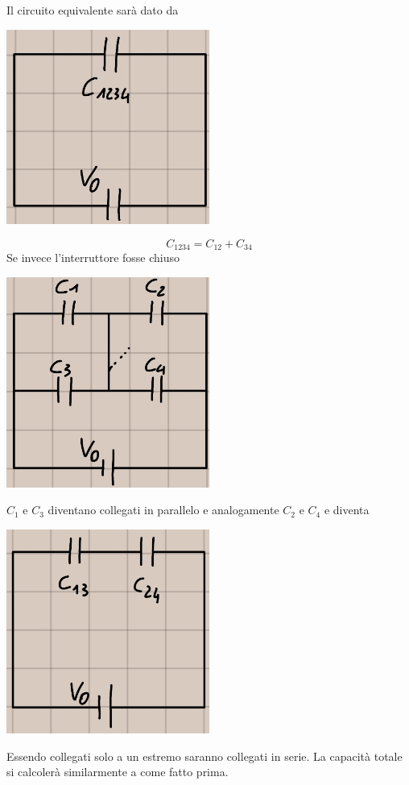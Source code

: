 \documentclass[a4paper, 12pt]{book}
\theoremstyle{plain}
\begin{document}
Il circuito equivalente sarà dato da 
\begin{center}
    \includegraphics[width=0.5\textwidth]{coll_parall_3.jpg}
\end{center}
\[C_{1234} = C_{12} + C_{34} \] 
Se invece l'interruttore fosse chiuso 
\begin{center}
    \includegraphics[width=0.5\textwidth]{int_chiuso.jpg}
\end{center}
$C_1$ e $C_3$ diventano collegati in parallelo e analogamente
$C_2$ e $C_4$ e diventa 
\begin{center}
    \includegraphics[width=0.5\textwidth]{int_chiuso2.jpg}
\end{center}
Essendo collegati solo a un estremo saranno collegati in serie.
La capacità totale si calcolerà similarmente a come fatto prima.
\end{document}
